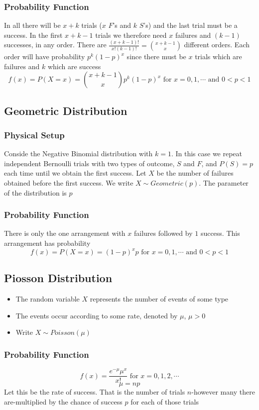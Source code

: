 \documentclass[11pt]{article}
\begin{document}
\subsubsection{Probability Function}
In all there will be $x+k$ trials ($x$ $F$'s and $k$ $S$'s) and the last trial must be a success. In the first $x+k-1$ trials we therefore need $x$ failures and $(k-1)$ successes, in any order.
There are $\frac{(x+k-1)!}{x!(k-1)!} = {{x+k-1}\choose{x}}$ different orders. Each order will have probability $p^k(1-p)^x$ since there must be $x$ trials which are failures and $k$ which are success
\[f(x) = P(X=x) = {{x+k-1}\choose x} p^k(1-p)^x \text{ for } x=0,1,\cdots \text{ and }0<p<1\]
\subsection{Geometric Distribution}
\subsubsection{Physical Setup}
Conside the Negative Binomial distribution with $k=1$. In this case we repeat independent Bernoulli trials with two types of outcome, $S$ and $F$, and $P(S) = p$ each time until we obtain the first success. 
Let $X$ be the number of failures obtained before the first success. We write $X\sim Geometric(p)$. The parameter of the distribution is $p$
\subsubsection{Probability Function}
There is only the one arrangement with $x$ failures followed by $1$ success. This arrangement has probability 
\[f(x) = P(X=x) = (1-p)^xp\text{ for } x=0,1,\cdots\text{ and } 0<p<1\]
\subsection{Piosson Distribution}
\begin{itemize}
    \item The random variable $X$ represents the number of events of some type
    \item The events occur according to some rate, denoted by $\mu$, $\mu>0$
    \item Write $X\sim Poisson(\mu)$
\end{itemize}
\subsubsection{Probability Function}
\[f(x) = \frac{e^{-\mu}\mu^x}{x!}\text{ for }x=0,1,2,\cdots\]
\[\mu = np\]
Let this be the rate of success. That is the number of trials $n$-however many there are-multiplied by the chance of success $p$ for each of those trials
\end{document}
